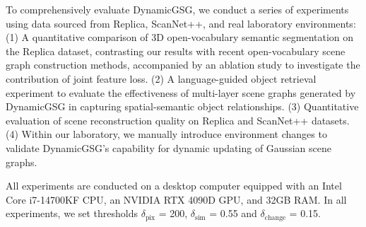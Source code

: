 To comprehensively evaluate DynamicGSG, we conduct a series of experiments using data sourced from Replica\cite{replica19arxiv}, ScanNet++\cite{yeshwanthliu2023scannetpp}, and real laboratory environments: (1) A quantitative comparison of 3D open-vocabulary semantic segmentation on the Replica dataset, contrasting our results with recent open-vocabulary scene graph construction methods, accompanied by an ablation study to investigate the contribution of joint feature loss. (2) A language-guided object retrieval experiment to evaluate the effectiveness of multi-layer scene graphs generated by DynamicGSG in capturing spatial-semantic object relationships. (3) Quantitative evaluation of scene reconstruction quality on Replica and ScanNet++ datasets. (4) Within our laboratory, we manually introduce environment changes to validate DynamicGSG's capability for dynamic updating of Gaussian scene graphs. 

All experiments are conducted on a desktop computer equipped with an Intel Core i7-14700KF CPU, an NVIDIA RTX 4090D GPU, and 32GB RAM. In all experiments, we set thresholds $ \delta_{\text{pix}} $ = 200, $ \delta_{\text{sim}} $ = 0.55 and $ \delta_{\text{change}} $ = 0.15.

